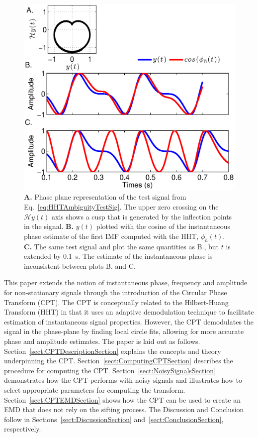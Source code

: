 \documentclass[journal,11pt,a4paper,onecolumn,draftcls]{IEEEtran}
\begin{document}
\begin{figure}
    \centering
    \includegraphics[scale=0.42]{./Figures/HHTAmbiguity}
    \caption[HHTAmbiguity]{\textbf{A.} Phase plane representation of the test signal from Eq.~\ref{eq:HHTAmbiguityTestSig}. The upper zero crossing on the $\mathcal{H}y(t)$ axis shows a cusp that is generated by the inflection points in the signal. \textbf{B.} $y(t)$ plotted with the cosine of the instantaneous phase estimate of the first IMF computed with the HHT, $\phi_h(t)$. \textbf{C.} The same test signal and plot the same quantities as B., but $t$ is extended by 0.1~s. The estimate of the instantaneous phase is inconsistent between plots B. and C.}
    \label{fig:HHTAmbiguity}
\end{figure}

This paper extends the notion of instantaneous phase, frequency and amplitude for non-stationary signals through the introduction of the Circular Phase Transform (CPT). The CPT is conceptually related to the Hilbert-Huang Transform (HHT) in that it uses an adaptive demodulation technique to facilitate estimation of instantaneous signal properties. However, the CPT demodulates the signal in the phase-plane by finding local circle fits, allowing for more accurate phase and amplitude estimates. The paper is laid out as follows. Section~\ref{sect:CPTDescriptionSection} explains the concepts and theory underpinning the CPT. Section~\ref{sect:ComputingCPTSection} describes the procedure for computing the CPT. Section~\ref{sect:NoisySignalsSection} demonstrates how the CPT performs with noisy signals and illustrates how to select appropriate parameters for computing the transform. Section~\ref{sect:CPTEMDSection} shows how the CPT can be used to create an EMD that does not rely on the sifting process. %
The Discussion and Conclusion follow in Sections~\ref{sect:DiscussionSection} and~\ref{sect:ConclusionSection}, respectively. 
\end{document}

